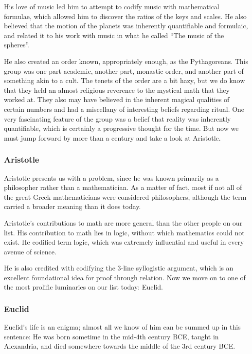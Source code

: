  His love of music led him to attempt to codify music with mathematical formulae, which allowed him to discover the ratios of the keys and scales. He also believed that the motion of the planets was inherently quantifiable and formulaic, and related it to his work with music in what he called “The music of the spheres”.\newline
 
He also created an order known, appropriately enough, as the Pythagoreans. This group was one part academic, another part, monastic order, and another part of something akin to a cult. The tenets of the order are a bit hazy, but we do know that they held an almost religious reverence to the mystical math that they worked at. They also may have believed in the inherent magical qualities of certain numbers and had a miscellany of interesting beliefs regarding ritual. One very fascinating feature of the group was a belief that reality was inherently quantifiable, which is certainly a progressive thought for the time. But now we must jump forward by more than a century and take a look at Aristotle.

\subsubsection{Aristotle}

Aristotle presents us with a problem, since he was known primarily as a philosopher rather
than a mathematician. As a matter of fact, most if not all of the great Greek mathematicians were
considered philosophers, although the term
carried a broader meaning than it does today.\newline

Aristotle’s contributions to math are more general than the other people on our list. His
contribution to math lies in logic, without which mathematics could not exist.
He codified term logic, which was extremely influential and useful in every avenue of science.\newline

 He is also credited
with codifying the 3-line syllogistic argument, which is an excellent foundational idea for proof
through relation. Now we move on to one of the most prolific luminaries on our list
today: Euclid.

\subsubsection{Euclid}

Euclid’s life is an enigma; almost all we know of him can be summed up in this sentence:
He was born sometime in the
mid-4th
century BCE, taught in Alexandria, and died somewhere
towards the middle of the 3rd
century BCE.\newline

